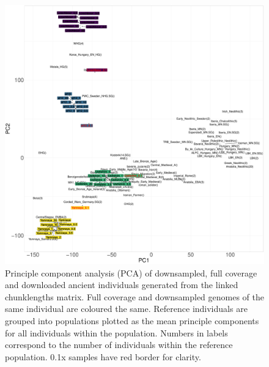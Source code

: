 {\begin{figure}[htp]
    \centering
    \includegraphics[width=1.0\textwidth]{../images/chapter1/PCA_panel_allInds.allCoverage.pdf}
    \caption{Principle component analysis (PCA) of downsampled, full coverage and downloaded ancient individuals generated from the linked chunklengths matrix. Full coverage and downsampled genomes of the same individual are coloured the same. Reference individuals are grouped into populations plotted as the mean principle components for all individuals within the population. Numbers in labels correspond to the number of individuals within the reference population. 0.1x samples have red border for clarity.}
    \label{fig:PCA_panel_allInds_allCoverage}
\end{figure}

}
